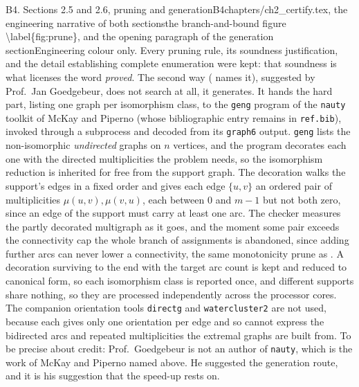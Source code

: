 \begin{offcutrewrite}{B4. Sections 2.5 and 2.6, pruning and generation}{B4}{chapters/ch2\_certify.tex, the engineering narrative of both sections}{the branch-and-bound figure \textbackslash{}label\{fig:prune\}, and the opening paragraph of the generation section}{Engineering colour only. Every pruning rule, its soundness justification, and the detail establishing complete enumeration were kept: that soundness is what licenses the word \emph{proved}.}
The second way ( names it), suggested by Prof.\ Jan Goedgebeur, does not search at all, it generates. It hands the hard part, listing one graph per isomorphism class, to the \texttt{geng} program of the \texttt{nauty} toolkit of McKay and Piperno (whose bibliographic entry remains in \texttt{ref.bib}), invoked through a subprocess and decoded from its \texttt{graph6} output. \texttt{geng} lists the non-isomorphic \emph{undirected} graphs on $n$ vertices, and the program decorates each one with the directed multiplicities the problem needs, so the isomorphism reduction is inherited for free from the support graph. The decoration walks the support's edges in a fixed order and gives each edge $\{u,v\}$ an ordered pair of multiplicities $\mu(u,v), \mu(v,u)$, each between $0$ and $m-1$ but not both zero, since an edge of the support must carry at least one arc. The checker measures the partly decorated multigraph as it goes, and the moment some pair exceeds the connectivity cap the whole branch of assignments is abandoned, since adding further arcs can never lower a connectivity, the same monotonicity prune as . A decoration surviving to the end with the target arc count is kept and reduced to canonical form, so each isomorphism class is reported once, and different supports share nothing, so they are processed independently across the processor cores. The companion orientation tools \texttt{directg} and \texttt{watercluster2} are not used, because each gives only one orientation per edge and so cannot express the bidirected arcs and repeated multiplicities the extremal graphs are built from. To be precise about credit: Prof.\ Goedgebeur is not an author of \texttt{nauty}, which is the work of McKay and Piperno named above. He suggested the generation route, and it is his suggestion that the speed-up rests on.
\end{offcutrewrite}

